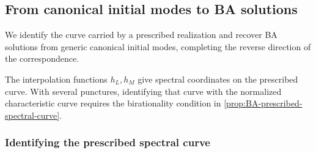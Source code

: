 \subsection{From canonical initial modes to BA solutions}
\label{sec:BA-spectral-converse}
\label{sec:BA-reconstruction-flows}

We identify the curve carried by a prescribed realization and recover
BA solutions from generic canonical initial modes, completing the
reverse direction of the correspondence.

The interpolation functions $h_L,h_M$ give spectral coordinates on
the prescribed curve. With several punctures, identifying that curve
with the normalized characteristic curve requires the birationality
condition in \cref{prop:BA-prescribed-spectral-curve}.

\subsubsection{Identifying the prescribed spectral curve}

